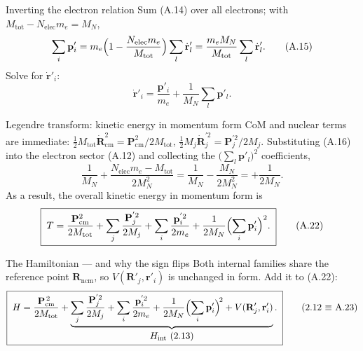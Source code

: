 \documentclass[aspectratio=169,10pt]{beamer}
\newcommand{\stagenum}{0}
\newcommand{\setstage}[1]{\renewcommand{\stagenum}{#1}}
\begin{document}
\begin{frame}{Inverting the electron relation}
\setstage{1}
Sum (A.14) over all electrons; with $M_{\mathrm{tot}}-N_{\mathrm{elec}}m_e=M_N$,
\begin{equation*}
\sum_i\mathbf p'_i = m_e\Bigl(1-\frac{N_{\mathrm{elec}}m_e}{M_{\mathrm{tot}}}\Bigr)\sum_l\dot{\mathbf r}'_l = \frac{m_eM_N}{M_{\mathrm{tot}}}\sum_l\dot{\mathbf r}'_l . \tag{A.15}
\end{equation*}
Solve for $\dot{\mathbf r}'_i$:
\begin{equation*}
\boxed{\;\dot{\mathbf r}'_i = \frac{\mathbf p'_i}{m_e} + \frac{1}{M_N}\sum_l\mathbf p'_l .\;} \tag{A.16}
\end{equation*}
\end{frame}

\begin{frame}{Legendre transform: kinetic energy in momentum form}
\setstage{1}
CoM and nuclear terms are immediate: $\tfrac12M_{\mathrm{tot}}\dot{\mathbf R}_{\mathrm{cm}}^2=\mathbf P_{\mathrm{cm}}^2/2M_{\mathrm{tot}}$, $\tfrac12M_j\dot{\mathbf R}_j^{'2}=\mathbf P_j^{'2}/2M_j$. Substituting (A.16) into the electron sector (A.12) and collecting the $\bigl(\sum_l\mathbf p'_l\bigr)^2$ coefficients,
\begin{equation*}
\frac{1}{M_N}+\frac{N_{\mathrm{elec}}m_e-M_{\mathrm{tot}}}{2M_N^2} = \frac{1}{M_N}-\frac{M_N}{2M_N^2} = +\frac{1}{2M_N} . \tag{A.21}
\end{equation*}
As a result, the overall kinetic energy in momentum form is
\begin{equation*}
\boxed{\;T = \frac{\mathbf P_{\mathrm{cm}}^{2}}{2M_{\mathrm{tot}}} + \sum_j\frac{\mathbf P_j^{'2}}{2M_j} + \sum_i\frac{\mathbf p_i^{'2}}{2m_e} + \frac{1}{2M_N}\Bigl(\sum_i\mathbf p'_i\Bigr)^{2}.\;} \tag{A.22}
\end{equation*}
\end{frame}

\begin{frame}{The Hamiltonian --- and why the sign flips}
\setstage{1}
Both internal families share the reference point $\mathbf R_{\mathrm{ncm}}$, so $V(\mathbf R'_j,\mathbf r'_i)$ is unchanged in form. Add it to (A.22):
\begin{equation*}
\boxed{\;H = \frac{\mathbf{P}_{\mathrm{cm}}^{\,2}}{2M_{\mathrm{tot}}}
+\underbrace{\sum_j\frac{\mathbf{P}_j^{'2}}{2M_j}+\sum_i\frac{\mathbf{p}_i^{'2}}{2m_e}
+\frac{1}{2M_N}\Bigl(\sum_i\mathbf{p}'_i\Bigr)^{\!2}+V(\mathbf R'_j,\mathbf r'_i)}_{\textstyle H_{\mathrm{int}}\ (2.13)}.\;} \tag{2.12 $\equiv$ A.23}
\end{equation*}
\centering
\end{frame}
\end{document}
